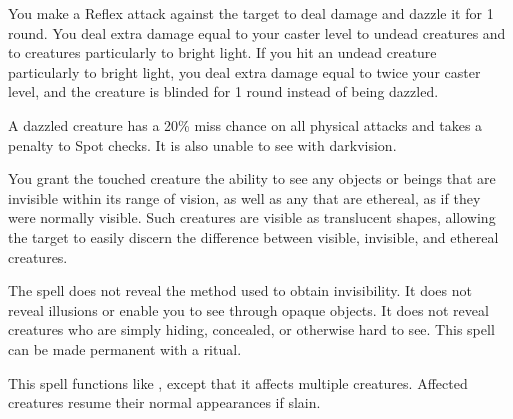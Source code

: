 \spellrng{\rngclose}
\begin{spelleffect}
    You make a Reflex attack against the target to deal damage and dazzle it for 1 round. You deal extra damage equal to your caster level to undead creatures and to creatures particularly \vulnerable to bright light. If you hit an undead creature particularly \vulnerable to bright light, you deal extra damage equal to twice your caster level, and the creature is blinded for 1 round instead of being dazzled.
\end{spelleffect}
\begin{spellnotes}
  A dazzled creature has a 20\% miss chance on all physical attacks and takes a  penalty to Spot checks. It is also unable to see with darkvision.
\end{spellnotes}

\begin{spelleffect}
  You grant the touched creature the ability to see any objects or beings that are invisible within its range of vision, as well as any that are ethereal, as if they were normally visible. Such creatures are visible as translucent shapes, allowing the target to easily discern the difference between visible, invisible, and ethereal creatures.
\end{spelleffect}
\begin{spellnotes}
  The spell does not reveal the method used to obtain invisibility. It does not reveal illusions or enable you to see through opaque objects. It does not reveal creatures who are simply hiding, concealed, or otherwise hard to see.
This spell can be made permanent with a  ritual.
\end{spellnotes}

\spellrng{\rngclose}
\begin{spelleffect}
  This spell functions like , except that it affects multiple creatures. Affected creatures resume their normal appearances if slain.
\end{spelleffect}

